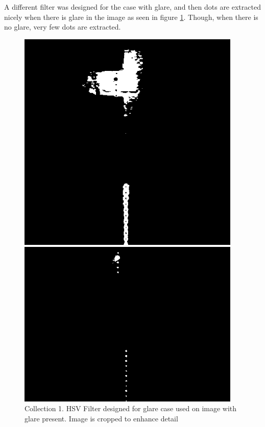 A different filter was designed for the case with glare, and then dots are extracted nicely when there is glare in the image as seen in figure \ref{fig:glare1_glare_filt_hsv}. Though, when there is no glare, very few dots are extracted.
\begin{figure}[h!]
    \centering
    \begin{minipage}[t]{0.48\textwidth}
        \centering
        \includegraphics[width=0.95\textwidth]{figures/ImageAnalysis/filtered_glare1_noglarefilt_hsv.png}
        \caption{Collection 1. HSV Filter designed for base case used on image with glare present. Image is cropped to enhance detail. }
    \label{fig:glare1_no_glare_filt_hsv}
    \end{minipage}%
    \hspace{.03\textwidth}
    \begin{minipage}[t]{0.48\textwidth}
        \centering
        \includegraphics[width=0.95\textwidth]{figures/ImageAnalysis/filtered_glare1_glarefilt_hsv.png}
        \caption{Collection 1. HSV Filter designed for glare case used on image with glare present. Image is cropped to enhance detail}
        \label{fig:glare1_glare_filt_hsv}
    \end{minipage}
\end{figure}
